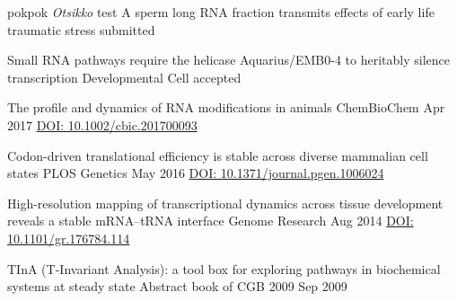 \documentclass{klmr-cv}
\begin{document}
\begin{bibliography}
     pokpok {\em Otsikko} test 
    {A sperm long RNA fraction transmits effects of early life traumatic stress}
    {}
    {submitted}
    {}

    {Small RNA pathways require the helicase Aquarius/EMB0-4 to heritably
        silence transcription}
    {Developmental Cell}
    {accepted}
    {}

    {The profile and dynamics of RNA modifications in animals}
    {ChemBioChem}
    {Apr 2017}
    {\href{http://dx.doi.org/10.1002/cbic.201700093}{DOI:
        10.1002/cbic.201700093}}

    {Codon-driven translational efficiency is stable across diverse mammalian
        cell states}
    {PLOS Genetics}
    {May 2016}
    {\href{http://dx.doi.org/10.1371/journal.pgen.1006024}{DOI:
        10.1371/journal.pgen.1006024}}

    {High-resolution mapping of transcriptional dynamics across tissue
        development reveals a stable mRNA--tRNA interface}
    {Genome Research}
    {Aug 2014}
    {\href{http://dx.doi.org/10.1101/gr.176784.114}{DOI: 10.1101/gr.176784.114}}

    {TInA (T-Invariant Analysis): a tool box for exploring pathways in
        biochemical systems at steady state}
    {Abstract book of CGB 2009}
    {Sep 2009}
    {}
\end{bibliography}
\fi
\end{document}
